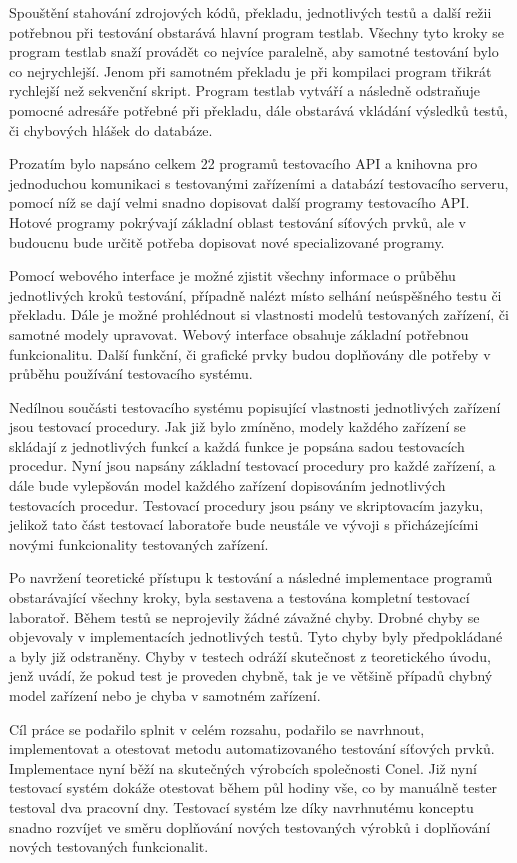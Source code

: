 Spouštění stahování zdrojových kódů, překladu, jednotlivých testů a další režii potřebnou při testování obstarává hlavní program testlab. Všechny tyto kroky se program testlab snaží provádět co nejvíce paralelně, aby samotné testování bylo co nejrychlejší. Jenom při samotném překladu je při kompilaci program třikrát rychlejší než sekvenční skript. Program testlab vytváří a následně odstraňuje pomocné adresáře potřebné při překladu, dále obstarává vkládání výsledků testů, či chybových hlášek do databáze.

Prozatím bylo napsáno celkem 22 programů testovacího API a knihovna pro jednoduchou komunikaci s testovanými zařízeními a databází testovacího serveru, pomocí níž se dají velmi snadno dopisovat další programy testovacího API. Hotové programy pokrývají základní oblast testování síťových prvků, ale v budoucnu bude určitě potřeba dopisovat nové specializované programy.

Pomocí webového interface je možné zjistit všechny informace o průběhu jednotlivých kroků testování, případně nalézt místo selhání neúspěšného testu či překladu. Dále je možné prohlédnout si vlastnosti modelů testovaných zařízení, či samotné modely upravovat. Webový interface obsahuje základní potřebnou funkcionalitu. Další funkční, či grafické prvky budou doplňovány dle potřeby v průběhu používání testovacího systému.

Nedílnou součásti testovacího systému popisující vlastnosti jednotlivých zařízení jsou testovací procedury. Jak již bylo zmíněno, modely každého zařízení se skládají z jednotlivých funkcí a každá funkce je popsána sadou testovacích procedur. Nyní jsou napsány základní testovací procedury pro každé zařízení, a dále bude vylepšován model každého zařízení dopisováním jednotlivých testovacích procedur. Testovací procedury jsou psány ve skriptovacím jazyku, jelikož tato část testovací laboratoře bude neustále ve vývoji s přicházejícími novými funkcionality testovaných zařízení.

Po navržení teoretické přístupu k testování a následné implementace programů obstarávající všechny kroky, byla sestavena a testována kompletní testovací laboratoř. Během testů se neprojevily žádné závažné chyby. Drobné chyby se objevovaly v implementacích jednotlivých testů. Tyto chyby byly předpokládané a byly již odstraněny. Chyby v testech odráží skutečnost z teoretického úvodu, jenž uvádí, že pokud test je proveden chybně, tak je ve většině případů chybný model zařízení nebo je chyba v samotném zařízení.

Cíl práce se podařilo splnit v celém rozsahu, podařilo se navrhnout, implementovat a otestovat metodu automatizovaného testování síťových prvků. Implementace nyní běží na skutečných výrobcích společnosti Conel. Již nyní testovací systém dokáže otestovat během půl hodiny vše, co by manuálně tester testoval dva pracovní dny. Testovací systém lze díky navrhnutému konceptu snadno rozvíjet ve směru doplňování nových testovaných výrobků i doplňování nových testovaných funkcionalit.

\endinput
